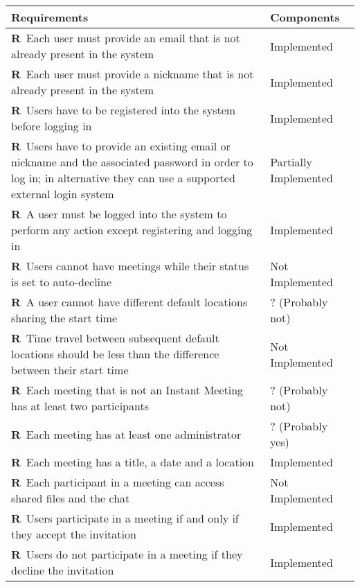 \newcommand{\reqNum}{\stepcounter{countReq}\thecountReq}

\def\arraystretch{1.5}
\begin{longtable}{|m{7cm}|m{7cm}|}
	\hline
	\textbf{Requirements}            & 		\textbf{Components}		    \\ \hline
	\textbf{R\reqNum}~Each user must provide an email that is not already present in the system & Implemented	\\ \hline
	\textbf{R\reqNum}~Each user must provide a nickname that is not already present in the system & Implemented	\\ \hline
	\textbf{R\reqNum}~Users have to be registered into the system before logging in & Implemented	\\ \hline
	\textbf{R\reqNum}~Users have to provide an existing email or nickname and the associated password in order to log in; in alternative they can use a supported external login system & Partially Implemented	\\ \hline
	\textbf{R\reqNum}~A user must be logged into the system to perform any action except registering and logging in & Implemented	\\ \hline
	\textbf{R\reqNum}~Users cannot have meetings while their status is set to auto-decline & Not Implemented	\\ \hline
	\textbf{R\reqNum}~A user cannot have different default locations sharing the start time & ? (Probably not)	\\ \hline
	\textbf{R\reqNum}~Time travel between subsequent default locations should be less than the difference between their start time & Not Implemented	\\ \hline
	\textbf{R\reqNum}~Each meeting that is not an Instant Meeting has at least two participants & ? (Probably not)	\\ \hline
	\textbf{R\reqNum}~Each meeting has at least one administrator & ? (Probably yes)	\\ \hline
	\textbf{R\reqNum}~Each meeting has a title, a date and a location & Implemented	\\ \hline
	\textbf{R\reqNum}~Each participant in a meeting can access shared files and the chat & Not Implemented \\ \hline
	\textbf{R\reqNum}~Users participate in a meeting if and only if they accept the invitation & Implemented	\\ \hline
	\textbf{R\reqNum}~Users do not participate in a meeting if they decline the invitation & Implemented	\\ \hline

\end{longtable}
